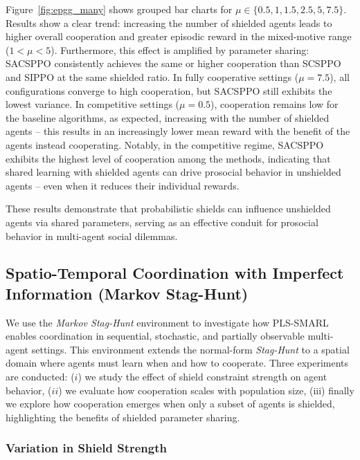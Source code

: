 \documentclass{ecai}
\theoremstyle{plain}
\theoremstyle{definition}
\theoremstyle{remark}
\begin{document}
Figure~\ref{fig:epgg_many} shows grouped bar charts for $\mu \in \{0.5, 1, 1.5, 2.5, 5, 7.5\}$. Results show a clear trend: increasing the number of shielded agents leads to higher overall cooperation and greater episodic reward in the mixed-motive range ($1 < \mu < 5$). Furthermore, this effect is amplified by parameter sharing: SACSPPO consistently achieves the same or higher cooperation than SCSPPO and SIPPO at the same shielded ratio. In fully cooperative settings ($\mu=7.5$), all configurations converge to high cooperation, but SACSPPO still exhibits the lowest variance. In competitive settings ($\mu=0.5$), cooperation remains low for the baseline algorithms, as expected, increasing with the number of shielded agents -- this results in an increasingly lower mean reward with the benefit of the agents instead cooperating. Notably, in the competitive regime, SACSPPO exhibits the highest level of cooperation among the methods, indicating that shared learning with shielded agents can drive prosocial behavior in unshielded agents -- even when it reduces their individual rewards.

These results demonstrate that probabilistic shields can influence unshielded agents via shared parameters, serving as an effective conduit for prosocial behavior in multi-agent social dilemmas.


\subsection{Spatio-Temporal Coordination with Imperfect Information (Markov Stag-Hunt)}\label{sec:exp:msh}
We use the \textit{Markov Stag-Hunt} environment \citep{peysakhovich2018prosocial} to investigate how PLS-SMARL enables coordination in sequential, stochastic, and partially observable multi-agent settings. This environment extends the normal-form \textit{Stag-Hunt} to a spatial domain where agents must learn when and how to cooperate. Three experiments are conducted: ($i$) we study the effect of shield constraint strength on agent behavior, ($ii$) we evaluate how cooperation scales with population size, (iii) finally we explore how cooperation emerges when only a subset of agents is shielded, highlighting the benefits of shielded parameter sharing.

\subsubsection{Variation in Shield Strength} \label{exp:shield_stength_variation}
\end{document}
